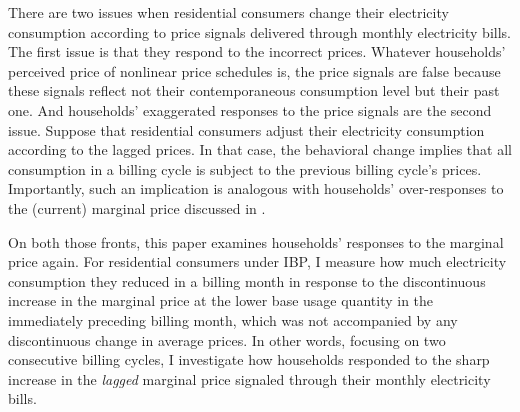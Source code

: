 There are two issues when residential consumers change their electricity consumption according to price signals delivered through monthly electricity bills. The first issue is that they respond to the incorrect prices. Whatever households' perceived price of nonlinear price schedules is, the price signals are false because these signals reflect not their contemporaneous consumption level but their past one. And households' exaggerated responses to the price signals are the second issue. Suppose that residential consumers adjust their electricity consumption according to the lagged prices. In that case, the behavioral change implies that all consumption in a billing cycle is subject to the previous billing cycle's prices. Importantly, such an implication is analogous with households' over-responses to the (current) marginal price discussed in \cite{Misunderstanding-Nonlinear-Prices_2020_(Shaffer)}. 

On both those fronts, this paper examines households' responses to the marginal price again. For residential consumers under IBP, I measure how much electricity consumption they reduced in a billing month in response to the discontinuous increase in the marginal price at the lower base usage quantity in the immediately preceding billing month, which was not accompanied by any discontinuous change in average prices. In other words, focusing on two consecutive billing cycles, I investigate how households responded to the sharp increase in the \textit{lagged} marginal price signaled through their monthly electricity bills.

